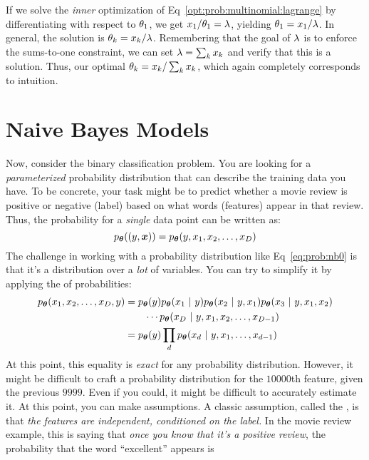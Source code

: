 If we solve the \emph{inner} optimization of
Eq~\eqref{opt:prob:multinomial:lagrange} by differentiating with
respect to $\theta_1$, we get $x_1 / \theta_1 = \lambda$, yielding $\theta_1 = x_1
/ \lambda$.  In general, the solution is $\theta_k = x_k / \lambda$.  Remembering
that the goal of $\lambda$ is to enforce the sums-to-one constraint, we
can set $\lambda = \sum_k x_k$ and verify that this is a solution.  Thus,
our optimal $\theta_k = x_k / \sum_k x_k$, which again completely
corresponds to intuition.

\section{Naive Bayes Models}

Now, consider the binary classification problem.  You are looking for
a \emph{parameterized} probability distribution that can describe the
training data you have.  To be concrete, your task might be to predict
whether a movie review is positive or negative (label) based on what
words (features) appear in that review.  Thus, the probability for a
\emph{single} data point can be written as:
%
\begin{equation} \label{eq:prob:nb0}
  p_{\boldsymbol{\theta}}( (y, \boldsymbol{x}) )
  = p_{\boldsymbol{\theta}}( y, x_1, x_2, \dots, x_D )
\end{equation}
%
The challenge in working with a probability distribution like
Eq~\eqref{eq:prob:nb0} is that it's a distribution over a \emph{lot}
of variables.  You can try to simplify it by applying the
 of probabilities:
%
\begin{align}
  p_{\boldsymbol{\theta}}( x_1, x_2, \dots, x_D, y )
 &= p_{\boldsymbol{\theta}}(y) p_{\boldsymbol{\theta}}(x_1 \textrm{~}\arrowvert\textrm{~} y)
    p_{\boldsymbol{\theta}}(x_2 \textrm{~}\arrowvert\textrm{~} y, x_1)
    p_{\boldsymbol{\theta}}(x_3 \textrm{~}\arrowvert\textrm{~} y, x_1, x_2) \nonumber\\
 &\quad\quad   \cdots
    p_{\boldsymbol{\theta}}(x_D \textrm{~}\arrowvert\textrm{~} y, x_1, x_2, \dots, x_{D-1})
  \\
&= p_{\boldsymbol{\theta}}(y) \prod_d p_{\boldsymbol{\theta}}(x_d \textrm{~}\arrowvert\textrm{~} y, x_1, \dots, x_{d-1})
\label{eq:prob:nbchain}
\end{align}
%
At this point, this equality is \emph{exact} for any probability
distribution.  However, it might be difficult to craft a probability
distribution for the $10000$th feature, given the previous $9999$.
Even if you could, it might be difficult to accurately estimate it.
At this point, you can make assumptions.  A classic assumption, called
the , is that \emph{the features are
  independent, conditioned on the label.}  In the movie review
example, this is saying that \emph{once you know that it's a positive
  review}, the probability that the word ``excellent'' appears is
